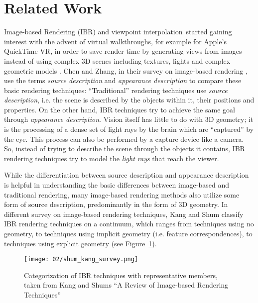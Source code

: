 \section{Related Work}
Image-based Rendering (IBR) and viewpoint interpolation\footnotemark\ started gaining interest with the advent of virtual walkthroughs, for example for Apple's QuickTime\textsuperscript{\textregistered} VR, in order to save render time by generating views from images instead of using complex 3D scenes including textures, lights and complex geometric models \cite{quicktime}.
Chen and Zhang, in their survey on image-based rendering \cite{survey2004}, use the terms \emph{source description} and \emph{appearance description} to compare these basic rendering techniques: ``Traditional'' rendering techniques use \emph{source description}, i.e. the scene is described by the objects within it, their positions and properties. On the other hand, IBR techniques try to achieve the same goal through \emph{appearance description}. Vision itself has little to do with 3D geometry; it is the processing of a dense set of light rays by the brain which are ``captured'' by the eye. This process can also be performed by a capture device like a camera. So, instead of trying to describe the scene through the objects it contains, IBR rendering techniques try to model the \emph{light rays} that reach the viewer. 


While the differentiation between source description and appearance description is helpful in understanding the basic differences between image-based and traditional rendering, many image-based rendering methods also utilize some form of source description, predominantly in the form of 3D geometry. In different survey on image-based rendering techniques, Kang and Shum \cite{survey2000} classify IBR rendering techniques on a continuum, which ranges from techniques using no geometry, to techniques using implicit geometry (i.e. feature correspondences), to techniques using explicit geometry (see Figure~\ref{fig:survey_categorization}).

\begin{figure}
		\centering
		\texttt{[image: 02/shum\_kang\_survey.png]}
    \caption[Categorization of IBR techniques from \cite{survey2000}]{Categorization of IBR techniques with representative members, taken from Kang and Shums ``A Review of Image-based Rendering Techniques''\cite{survey2000}}
		\label{fig:survey_categorization}
\end{figure}

